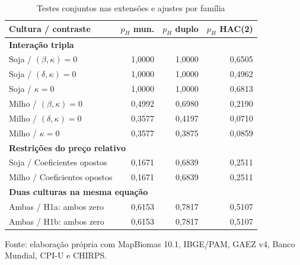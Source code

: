 \begin{table}[htbp]
\centering
\small
\setlength{\tabcolsep}{3pt}
\renewcommand{\arraystretch}{1.1}
\normalcaption\captionstyle{\centering}
\caption{Testes conjuntos nas extensões e ajustes por família}
\label{tab:h1-extensoes-etapa9}
\begin{tabular}{lrrr}
\hline
Cultura / contraste & $p_H$ mun. & $p_H$ duplo & $p_H$ HAC(2) \\
\hline\multicolumn{4}{l}{\textbf{Interação tripla}} \\
Soja / $(\beta,\kappa)=0$ & 1,0000 & 1,0000 & 0,6505 \\
Soja / $(\delta,\kappa)=0$ & 1,0000 & 1,0000 & 0,4962 \\
Soja / $\kappa=0$ & 1,0000 & 1,0000 & 0,6813 \\
Milho / $(\beta,\kappa)=0$ & 0,4992 & 0,6980 & 0,2190 \\
Milho / $(\delta,\kappa)=0$ & 0,3577 & 0,4197 & 0,0710 \\
Milho / $\kappa=0$ & 0,3577 & 0,3875 & 0,0859 \\
\hline\multicolumn{4}{l}{\textbf{Restrições do preço relativo}} \\
Soja / Coeficientes opostos & 0,1671 & 0,6839 & 0,2511 \\
Milho / Coeficientes opostos & 0,1671 & 0,6839 & 0,2511 \\
\hline\multicolumn{4}{l}{\textbf{Duas culturas na mesma equação}} \\
Ambas / H1a: ambos zero & 0,6153 & 0,7817 & 0,5107 \\
Ambas / H1b: ambos zero & 0,6153 & 0,7817 & 0,5107 \\
\hline\end{tabular}
\par\smallskip
\begin{minipage}{\textwidth}\footnotesize\centering
Fonte: elaboração própria com MapBiomas 10.1, IBGE/PAM, GAEZ v4, Banco Mundial, CPI-U e CHIRPS.
\end{minipage}
\end{table}
